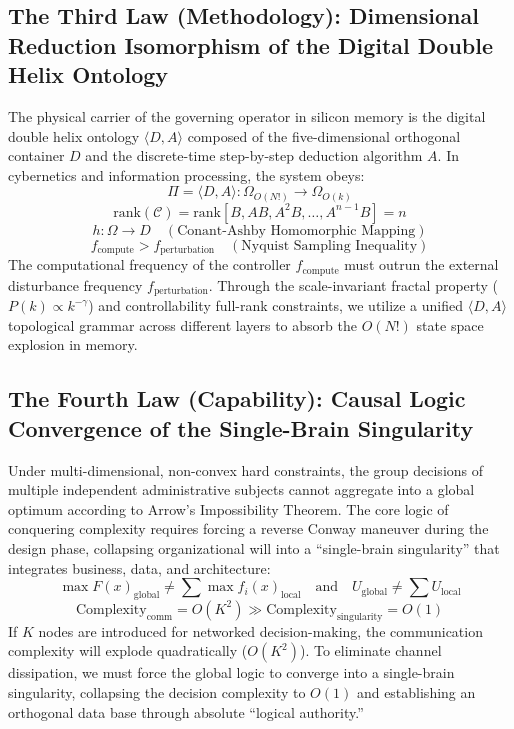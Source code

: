 \documentclass{article}
\begin{document}
\subsection*{The Third Law (Methodology): Dimensional Reduction Isomorphism of the Digital Double Helix Ontology}
The physical carrier of the governing operator in silicon memory is the digital double helix ontology $\langle D, A \rangle$ composed of the five-dimensional orthogonal container $D$ and the discrete-time step-by-step deduction algorithm $A$. In cybernetics and information processing, the system obeys:
\begin{equation}
    \Pi = \langle D, A \rangle : \Omega_{O(N!)} \longrightarrow \Omega_{O(k)}
\end{equation}
\begin{equation}\label{controllability}
    \text{rank}(\mathcal{C}) = \text{rank}\left[ B, AB, A^2B, \dots, A^{n-1}B \right] = n
\end{equation}
\begin{equation}
    h: \Omega \longrightarrow D \quad (\text{Conant-Ashby Homomorphic Mapping})
\end{equation}
\begin{equation}\label{sampling}
    f_{\text{compute}} > f_{\text{perturbation}} \quad (\text{Nyquist Sampling Inequality})
\end{equation}
The computational frequency of the controller $f_{\text{compute}}$ must outrun the external disturbance frequency $f_{\text{perturbation}}$. Through the scale-invariant fractal property ($P(k) \propto k^{-\gamma}$) and controllability full-rank constraints, we utilize a unified $\langle D, A \rangle$ topological grammar across different layers to absorb the $O(N!)$ state space explosion in memory.

\subsection*{The Fourth Law (Capability): Causal Logic Convergence of the Single-Brain Singularity}
Under multi-dimensional, non-convex hard constraints, the group decisions of multiple independent administrative subjects cannot aggregate into a global optimum according to Arrow's Impossibility Theorem. The core logic of conquering complexity requires forcing a reverse Conway maneuver during the design phase, collapsing organizational will into a ``single-brain singularity'' that integrates business, data, and architecture:
\begin{equation}
    \max F(x)_{\text{global}} \neq \sum \max f_i(x)_{\text{local}} \quad \text{and} \quad U_{\text{global}} \neq \sum U_{\text{local}}
\end{equation}
\begin{equation}
    \text{Complexity}_{\text{comm}} = O(K^2) \gg \text{Complexity}_{\text{singularity}} = O(1)
\end{equation}
If $K$ nodes are introduced for networked decision-making, the communication complexity will explode quadratically ($O(K^2)$). To eliminate channel dissipation, we must force the global logic to converge into a single-brain singularity, collapsing the decision complexity to $O(1)$ and establishing an orthogonal data base through absolute ``logical authority.''
\end{document}
